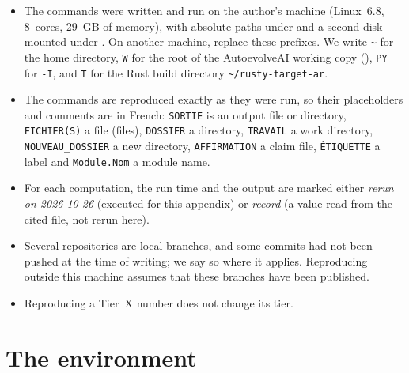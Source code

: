 \begin{warnbox}
\begin{itemize}
\item The commands were written and run on the author's machine (Linux~6.8, 8~cores, 29~GB of memory), with absolute
paths under  and a second disk mounted under
. On another machine, replace these prefixes. We write \texttt{\~{}} for the
home directory, \texttt{W} for the root of the AutoevolveAI working copy
(), \texttt{PY} for
 \texttt{-I}, and \texttt{T} for the Rust build directory
\texttt{\~{}/rusty-target-ar}.
\item The commands are reproduced exactly as they were run, so their placeholders and comments are in French:
\texttt{SORTIE} is an output file or directory, \texttt{FICHIER(S)} a file (files), \texttt{DOSSIER} a directory,
\texttt{TRAVAIL} a work directory, \texttt{NOUVEAU\_DOSSIER} a new directory, \texttt{AFFIRMATION} a claim file,
\texttt{ÉTIQUETTE} a label and \texttt{Module.Nom} a module name.
\item For each computation, the run time and the output are marked either \emph{rerun on 2026-10-26} (executed for this
appendix) or \emph{record} (a value read from the cited file, not rerun here).
\item Several repositories are local branches, and some commits had not been pushed at the time of writing; we say so
where it applies. Reproducing outside this machine assumes that these branches have been published.
\item Reproducing a Tier~X number does not change its tier.
\end{itemize}
\end{warnbox}

\section{The environment}\label{appE:sec:env}

